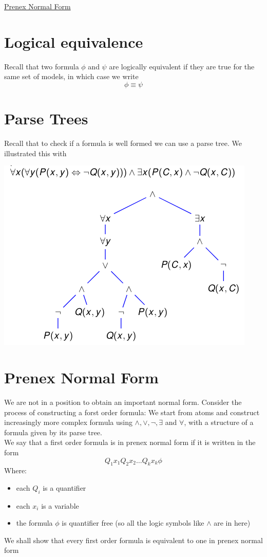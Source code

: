 \documentclass{article}[18pt]
\begin{document}
\begin{center}
\underline{\huge Prenex Normal Form}
\end{center}
\section{Logical equivalence}
Recall that two formula $\phi$ and $\psi$ are logically equivalent if they are true for the same set of models, in which case we write
$$\phi\equiv\psi$$
\section{Parse Trees}
Recall that to check if a formula is well formed we can use a parse tree. We illustrated this with
\begin{center}
	\includegraphics[scale=0.7]{parse}
\end{center}
\section{Prenex Normal Form}
We are not in a position to obtain an important normal form. Consider the process of constructing a forst order formula: We start from atoms and construct increasingly more complex formula using $\land,\lor,\lnot,\exists$ and $\forall$, with a structure of a formula given by its parse tree.\\
We say that a first order formula is in prenex normal form if it is written in the form
$$Q _ { 1 } x _ { 1 } Q _ { 2 } x _ { 2 } \ldots Q _ { k } x _ { k } \phi$$
Where:
\begin{itemize}
	\item each $Q_i$ is a quantifier
	\item each $x_i$ is a variable
	\item the formula $\phi$ is quantifier free (so all the logic symbols like $\land$ are in here)
\end{itemize}
We shall show that every first order formula is equivalent to one in prenex normal form
\end{document}
